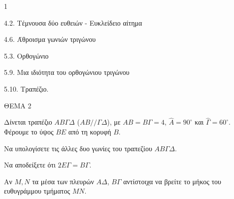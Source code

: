 \begin{ylh}{1}
    \item 4.2. Τέμνουσα δύο ευθειών - Ευκλείδειο αίτημα
    \item 4.6. Άθροισμα γωνιών τριγώνου
    \item 5.3. Ορθογώνιο
    \item 5.9. Μια ιδιότητα του ορθογώνιου τριγώνου
    \item 5.10. Τραπέζιο.
\end{ylh}

ΘΕΜΑ 2

Δίνεται τραπέζιο $AB\Gamma\Delta$ ($AB//\Gamma\Delta$), με $AB=B\Gamma=4$, $\widehat{A} = 90^{\circ}$ και $\widehat{\Gamma} = 60^{\circ}$. Φέρουμε το ύψος $BE$ από τη κορυφή $B$.

\begin{alist}
\item Να υπολογίσετε τις άλλες δυο γωνίες του τραπεζίου $AB\Gamma\Delta$. 
\item Να αποδείξετε ότι $2E\Gamma=B\Gamma$. 
\item Αν $M,N$ τα μέσα των πλευρών $A\Delta$, $B\Gamma$ αντίστοιχα να βρείτε το μήκος του ευθυγράμμου τμήματος $MN$. 

\begin{center}
\end{center}
\end{alist}
